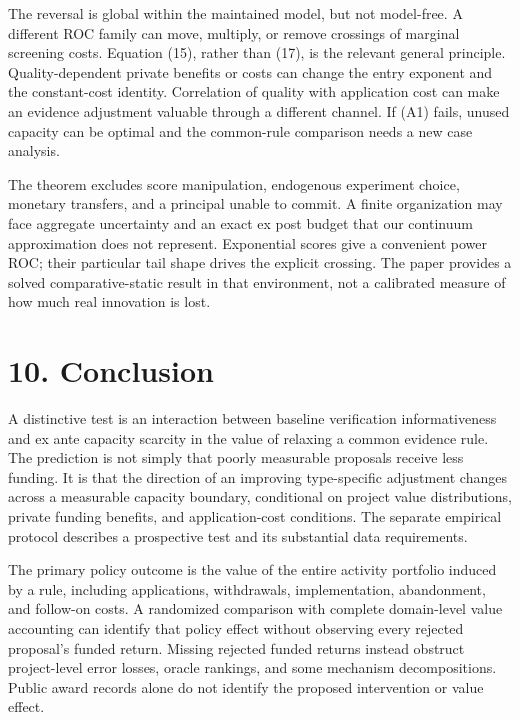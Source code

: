 \documentclass[
  11pt,
]{article}
\begin{document}
The reversal is global within the maintained model, but not model-free.
A different ROC family can move, multiply, or remove crossings of
marginal screening costs. Equation (15), rather than (17), is the
relevant general principle. Quality-dependent private benefits or costs
can change the entry exponent and the constant-cost identity.
Correlation of quality with application cost can make an evidence
adjustment valuable through a different channel. If (A1) fails, unused
capacity can be optimal and the common-rule comparison needs a new case
analysis.

The theorem excludes score manipulation, endogenous experiment choice,
monetary transfers, and a principal unable to commit. A finite
organization may face aggregate uncertainty and an exact ex post budget
that our continuum approximation does not represent. Exponential scores
give a convenient power ROC; their particular tail shape drives the
explicit crossing. The paper provides a solved comparative-static result
in that environment, not a calibrated measure of how much real
innovation is lost.

\section{10. Conclusion}\label{empirical-implication-and-conclusion}

A distinctive test is an interaction between baseline verification
informativeness and ex ante capacity scarcity in the value of relaxing a
common evidence rule. The prediction is not simply that poorly
measurable proposals receive less funding. It is that the direction of
an improving type-specific adjustment changes across a measurable
capacity boundary, conditional on project value distributions, private
funding benefits, and application-cost conditions. The separate
empirical protocol describes a prospective test and its substantial data
requirements.

The primary policy outcome is the value of the entire activity portfolio
induced by a rule, including applications, withdrawals, implementation,
abandonment, and follow-on costs. A randomized comparison with complete
domain-level value accounting can identify that policy effect without
observing every rejected proposal's funded return. Missing rejected
funded returns instead obstruct project-level error losses, oracle
rankings, and some mechanism decompositions. Public award records alone
do not identify the proposed intervention or value effect.
\end{document}
